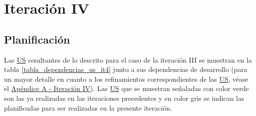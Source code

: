 \documentclass[a4paper, 12pt,twoside]{report}  %
\numberwithin{equation}{subsection} %
\begin{document}
\section{Iteración IV}
\label{descripcion_iteracion_IV}
\subsection{Planificación}
Las \hyperlink{US}{US} resultantes de lo descrito para el caso de la iteración III se muestran en la tabla \ref{tabla_dependencias_us_it4} junto a sus dependencias de desarrollo (para un mayor detalle en cuanto a los refinamientos correspondientes de las \hyperlink{US}{US}, véase el \hyperlink{apendice_a_IV}{Apéndice A - Iteración IV}). Las \hyperlink{US}{US} que se muestran señaladas con color verde son las ya realizadas en las iteraciones precedentes y en color gris se indican las planificadas para ser realizadas en la presente iteración.
\end{document}
